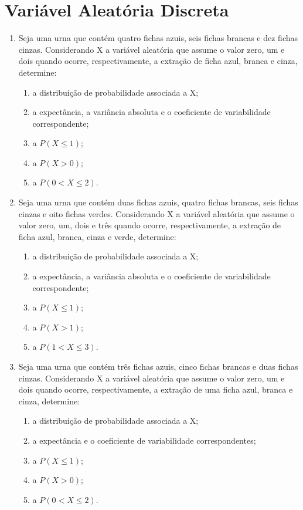 \chapter{Variável Aleatória Discreta}

\begin{enumerate}[resume]

\item Seja uma urna que contém quatro fichas azuis, seis fichas brancas e dez fichas cinzas. Considerando X a variável aleatória que assume o valor zero, um e dois quando ocorre, respectivamente, a extração de ficha azul, branca e cinza, determine: 
	\begin{enumerate}
	\item a distribuição de probabilidade associada a X;
	\item a expectância, a variância absoluta e o coeficiente de variabilidade correspondente;
	\item a $P(X \leq 1)$;
	\item a $P (X > 0)$;
	\item  a $P(0 < X \leq 2)$.
	\end{enumerate}

\item Seja uma urna que contém duas fichas azuis, quatro fichas brancas, seis fichas cinzas e oito fichas verdes. Considerando X a variável aleatória que assume o valor zero, um, dois e três quando ocorre, respectivamente, a extração de ficha azul, branca, cinza e verde, determine:
	\begin{enumerate}
	\item a distribuição de probabilidade associada a X;
	\item a expectância, a variância absoluta e o coeficiente de variabilidade correspondente;
	\item a $P(X \leq 1)$;
	\item a $P (X > 1)$;
	\item  a $P(1 < X \leq 3)$.
	\end{enumerate}

\item Seja uma urna que contém três fichas azuis, cinco fichas brancas e duas fichas cinzas. Considerando X a variável aleatória que assume o valor zero, um e dois quando ocorre, respectivamente, a extração de uma ficha azul, branca e cinza, determine:
	\begin{enumerate}
	\item a distribuição de probabilidade associada a X;
	\item a expectância e o coeficiente de variabilidade correspondentes;
	\item a $P(X \leq 1)$;
	\item a $P (X > 0)$;
	\item  a $P(0 < X \leq 2)$.
	\end{enumerate}
	

\end{enumerate}
